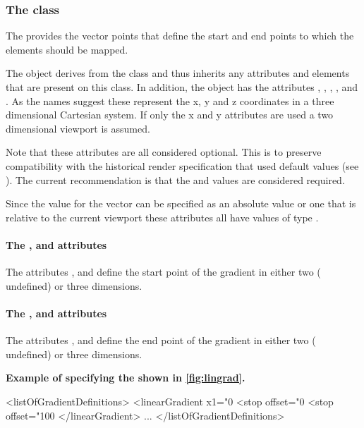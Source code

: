 \subsubsection{The  class}
\label{lineargradient-class}

The \LinearGradient provides the vector points that define the start and end points to which the \GradientStop elements should be mapped.

The \LinearGradient object derives from the \GradientBase class and thus
inherits any attributes and elements that are present on this class.
In addition, the \LinearGradient object has the attributes  , ,
, ,  and . As the names suggest these represent the x, y and z coordinates in a three dimensional Cartesian system. If only the x and y attributes are used a two dimensional viewport is assumed.

Note that these attributes are all considered optional. This is to preserve compatibility with the historical render specification that used default values (see ). The current recommendation is that the  and  values are considered required.

Since the value for the vector can be specified as an absolute value or one that is relative to the current viewport these attributes all have values of type \RelAbsVector.

\paragraph{The \fixttspace{}, \fixttspace{} and \fixttspace{} attributes}

The attributes ,  and  define the start point of the gradient in either two ( undefined) or three dimensions.

\paragraph{The \fixttspace{}, \fixttspace{} and \fixttspace{} attributes}

The attributes ,  and  define the end point of the gradient in either two ( undefined) or three dimensions.



{
  {\bf
Example of specifying the \LinearGradient shown in \ref{fig:lingrad}. 
}
}
{\footnotesize
\begin{example}
<listOfGradientDefinitions>
  <linearGradient x1="0%
    <stop offset="0%
    <stop offset="100%
  </linearGradient>
        ...
</listOfGradientDefinitions>
\end{example}
}

